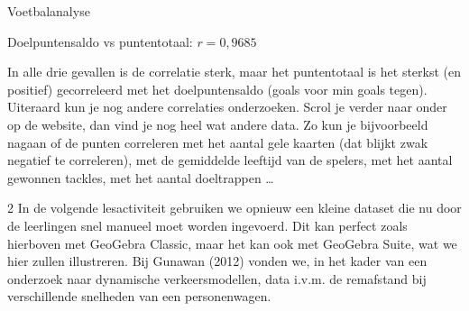 \begin{lesactiviteit}{Voetbalanalyse}
\begin{vraagenantwoord}
{	\begin{center}
		{\footnotesize Doelpuntensaldo vs puntentotaal: $r=0,9685$}
	\end{center}
	In alle drie gevallen is de correlatie sterk, maar het puntentotaal is het sterkst (en positief) gecorreleerd met het doelpuntensaldo (goals voor min goals tegen).\\
 Uiteraard kun je nog andere correlaties onderzoeken. Scrol je verder naar onder op de website, dan vind je nog heel wat andere data. Zo kun je bijvoorbeeld nagaan of de punten correleren met het aantal gele kaarten (dat blijkt zwak negatief te correleren), met de gemiddelde leeftijd van de spelers, met het aantal gewonnen tackles, met het aantal doeltrappen \dots}
\end{vraagenantwoord}
\end{lesactiviteit}

\begin{multicols}{2}
In de volgende lesactiviteit gebruiken we opnieuw een kleine dataset die nu door de leerlingen snel manueel moet worden ingevoerd. Dit kan perfect zoals hierboven met GeoGebra Classic, maar het kan ook met GeoGebra Suite, wat we hier zullen illustreren. Bij Gunawan (2012) vonden we, in het kader van een onderzoek naar dynamische verkeersmodellen, data i.v.m. de remafstand bij verschillende snelheden van een personenwagen.
\end{multicols}

